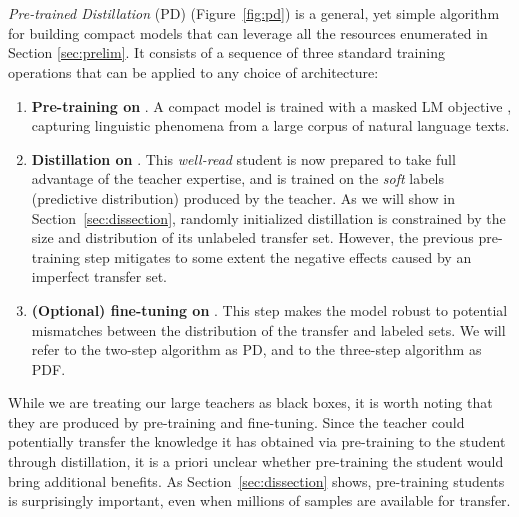 \section{\recipename}

\emph{Pre-trained Distillation} (PD) (Figure~\ref{fig:pd}) is a general, yet simple algorithm for building compact models that can leverage all the resources enumerated in Section \ref{sec:prelim}. It consists of a sequence of three standard training operations that can be applied to any choice of architecture:

\vspace{-5pt}
\begin{enumerate}
    \item \textbf{Pre-training on \DLM}. A compact model is trained with a masked LM objective \citep{bert}, capturing linguistic phenomena from a large corpus of natural language texts.
    \item \textbf{Distillation on \DT}. This \emph{well-read} student is now prepared to take full advantage of the teacher expertise, and is trained on the \emph{soft} labels (predictive distribution) produced by the teacher. As we will show in Section~\ref{sec:dissection}, randomly initialized distillation is constrained by the size and distribution of its unlabeled transfer set. However, the previous pre-training step mitigates to some extent the negative effects caused by an imperfect transfer set.
    \item \textbf{(Optional) fine-tuning on \DL}. This step makes the model robust to potential mismatches between the distribution of the transfer and labeled sets. We will refer to the two-step algorithm as PD, and to the three-step algorithm as PDF.
\end{enumerate}

While we are treating our large teachers as black boxes, it is worth noting that they are produced by pre-training and fine-tuning. Since the teacher could potentially transfer the knowledge it has obtained via pre-training to the student through distillation, it is a priori unclear whether pre-training the student  would bring additional benefits. As  Section~\ref{sec:dissection} shows, pre-training students  is  surprisingly important, even when millions of samples are available for transfer.